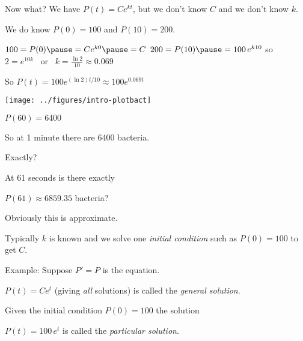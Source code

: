 \documentclass[10pt,aspectratio=169]{beamer}
\begin{document}
\begin{frame}

Now what?  We have $P(t) = C e^{kt}$, but we don't know $C$ and we don't know $k$.

\medskip
\pause

We do know $P(0)=100$ and $P(10)=200$.

\medskip
\pause

$100 = P(0) \pause = C e^{k0} \pause = C$
\pause
\qquad
$200 = P(10) \pause = 100 \, e^{k10}$
\qquad
so
~
$2 = e^{10k}$ \pause ~or~ $k = \frac{\ln 2}{10} \approx 0.069$ 

\medskip
\pause

So
\quad
$P(t)=100e^{(\ln 2)t/10} \approx 100e^{0.069 t}$

\pause

\vspace*{-0.2in}

\hspace*{2.5in}
\texttt{[image: ../figures/intro-plotbact]}

\vspace*{-1.8in}
\pause

$P(60) = 6400$

\pause

So at 1 minute there are 6400 bacteria.

\pause
\medskip

Exactly?

\pause
\medskip

At 61 seconds is there exactly

$P(61)\approx 6859.35$ bacteria?

\medskip
\pause

Obviously this is approximate.

\end{frame}

\begin{frame}

Typically $k$ is known and we solve one
\emph{initial condition} such as
$P(0)=100$ to get $C$.

\medskip
\pause

Example: Suppose $P' = P$ is the equation.

\medskip
\pause

$P(t) = C e^{t}$ \quad (giving \emph{all} solutions) is called the
\emph{general solution}.

\medskip
\pause

Given the initial condition $P(0) = 100$ the solution

\medskip

$P(t) = 100 \, e^{t}$ \quad is called the \emph{particular solution}.

\end{frame}
\end{document}
